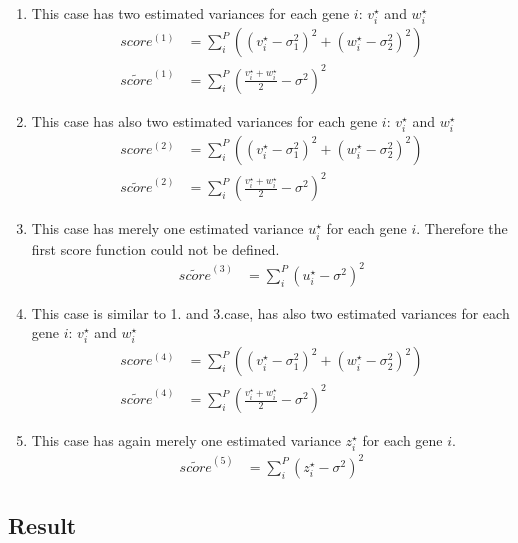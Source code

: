 \begin{enumerate}[(1)]
	\item This case has two estimated variances for each gene $i$: $v^\star_i$ and $w^\star_i$
	\begin{align*} 
		score^{(1)} &= \sum^P_i\left( (v^\star_i - \sigma_1^2)^2 + (w^\star_i - \sigma_2^2)^2\right) \\
		\widetilde {score}^{(1)} &= \sum^P_i\left( \frac{v^\star_i+w^\star_i}{2} - \sigma^2\right)^2
	\end{align*}	
	\item This case has also two estimated variances for each gene $i$: $v^\star_i$ and $w^\star_i$
	\begin{align*} 
		score^{(2)} &= \sum^P_i\left( (v^\star_i - \sigma_1^2)^2 + (w^\star_i - \sigma_2^2)^2\right) \\
		\widetilde {score}^{(2)} &= \sum^P_i\left( \frac{v^\star_i+w^\star_i}{2} - \sigma^2\right)^2
	\end{align*}
	\item This case has merely one estimated variance $u^\star_i$ for each gene $i$. Therefore the first score function could not be defined.
	\begin{align*} 
		\widetilde {score}^{(3)} &= \sum^P_i\left( u^\star_i - \sigma^2\right)^2
	\end{align*}
	\item This case is similar to 1. and 3.case, has also two estimated variances for each gene $i$: $v^\star_i$ and $w^\star_i$
	\begin{align*} 
		score^{(4)} &= \sum^P_i\left( (v^\star_i - \sigma_1^2)^2 + (w^\star_i - \sigma_2^2)^2\right) \\
		\widetilde {score}^{(4)} &= \sum^P_i\left( \frac{v^\star_i+w^\star_i}{2} - \sigma^2\right)^2
	\end{align*}
	\item This case has again merely one estimated variance $z^\star_i$ for each gene $i$.
	\begin{align*} 
		\widetilde {score}^{(5)} &= \sum^P_i\left( z^\star_i - \sigma^2\right)^2
	\end{align*}
\end{enumerate}
\subsection{Result}
	